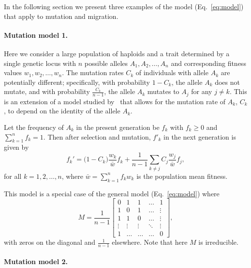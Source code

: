 \documentclass[9pt, a4paper, twocolumn]{extarticle}
\begin{document}
In the following section we present three examples of the model (Eq.~\ref{eq:model}) that apply to mutation and migration.

\paragraph*{Mutation model 1.}\label{sec:mut_model_1}

Here we consider a large population of haploids and a trait determined by a single genetic locus with $n$ possible alleles $A_1, A_2, \ldots, A_n$ and corresponding fitness values $w_1, w_2, \ldots, w_n$.
The mutation rates $C_k$ of individuals with allele $A_k$ are potentially different;
specifically, with probability $1-C_k$, the allele $A_k$ does not mutate, and with probability $\frac{C_k}{n-1}$, the allele $A_k$ mutates to $A_j$ for any $j \ne k$.
This is an extension of a model studied by~\citet{Altenberg2017} that allows for the mutation rate of $A_k$, $C_k$, to depend on the identity of the allele $A_k$.

Let the frequency of $A_k$ in the present generation be $f_k$ with $f_k \ge 0$ and $\sum_{k=1}^{n}{f_k}=1$.
Then after selection and mutation, $f'_k$ in the next generation is given by
\begin{equation}
f_k' = \big(1 - C_k\big) \frac{w_k}{\bar{w}} f_k + \frac{1}{n-1} \sum_{k \ne j}{C_j \frac{w_j}{\bar{w}} f_j},
\label{eq:mutation_model_1}
\end{equation}
for all $k=1, 2, \ldots, n$, where $\bar{w} = \sum_{k=1}^{n}{f_k w_k}$ is the population mean fitness.

This model is a special case of the general model (Eq.~\ref{eq:model}) where
\begin{equation} 
{M} = \frac{1}{n-1} \begin{bmatrix}
0 & 1 & 1 & \ldots & 1 \\
1 & 0 & 1 & \ldots & \vdots \\
1 & 1 & 0 & \ldots & \vdots \\
\vdots & \vdots & \vdots & \ddots & \vdots \\
1 & \ldots & \ldots & \ldots & 0
\end{bmatrix},
\end{equation}
with zeros on the diagonal and $\frac{1}{n-1}$ elsewhere.
Note that here ${M}$ is irreducible.

\paragraph*{Mutation model 2.}\label{sec:mut_model_2}
\end{document}
